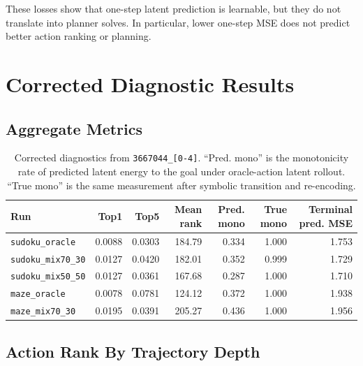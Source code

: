 \documentclass[11pt]{article}
\begin{document}
These losses show that one-step latent prediction is learnable, but they do not
translate into planner solves. In particular, lower one-step MSE does not
predict better action ranking or planning.

\section{Corrected Diagnostic Results}

\subsection{Aggregate Metrics}

\begin{table}[H]
\centering
\small
\begin{tabular}{lrrrrrr}
\toprule
Run & Top1 & Top5 & Mean rank & Pred. mono & True mono & Terminal pred. MSE \\
\midrule
\texttt{sudoku\_oracle} & 0.0088 & 0.0303 & 184.79 & 0.334 & 1.000 & 1.753 \\
\texttt{sudoku\_mix70\_30} & 0.0127 & 0.0420 & 182.01 & 0.352 & 0.999 & 1.729 \\
\texttt{sudoku\_mix50\_50} & 0.0127 & 0.0361 & 167.68 & 0.287 & 1.000 & 1.710 \\
\texttt{maze\_oracle} & 0.0078 & 0.0781 & 124.12 & 0.372 & 1.000 & 1.938 \\
\texttt{maze\_mix70\_30} & 0.0195 & 0.0391 & 205.27 & 0.436 & 1.000 & 1.956 \\
\bottomrule
\end{tabular}
\caption{Corrected diagnostics from \texttt{3667044\_[0-4]}. ``Pred. mono'' is the monotonicity rate of predicted latent energy to the goal under oracle-action latent rollout. ``True mono'' is the same measurement after symbolic transition and re-encoding.}
\end{table}

\subsection{Action Rank By Trajectory Depth}
\end{document}
